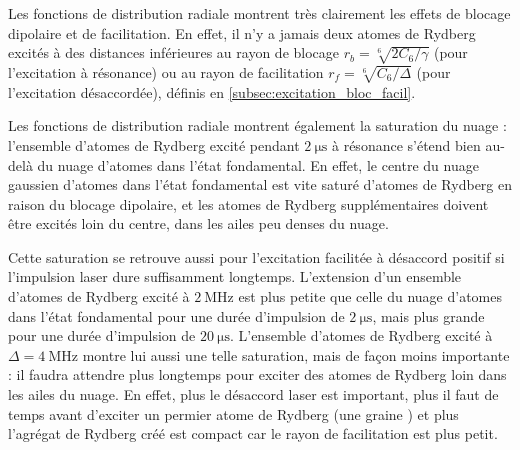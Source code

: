 Les fonctions de distribution radiale montrent très clairement les effets de blocage dipolaire et de facilitation.
En effet, il n'y a jamais deux atomes de Rydberg excités à des distances inférieures au rayon de blocage $r_b=\sqrt[6]{2C_6/\gamma}$ (pour l'excitation à résonance) ou au rayon de facilitation $r_f=\sqrt[6]{C_6/\Delta}$ (pour l'excitation désaccordée), définis en \ref{subsec:excitation_bloc_facil}.

Les fonctions de distribution radiale montrent également la saturation du nuage : l'ensemble d'atomes de Rydberg excité pendant $\SI{2}{\us}$ à résonance s'étend bien au-delà du nuage d'atomes dans l'état fondamental.
En effet, le centre du nuage gaussien d'atomes dans l'état fondamental est vite saturé d'atomes de Rydberg en raison du blocage dipolaire, et les atomes de Rydberg supplémentaires doivent être excités loin du centre, dans les ailes peu denses du nuage.

Cette saturation se retrouve aussi pour l'excitation facilitée à désaccord positif si l'impulsion laser dure suffisamment longtemps.
L'extension d'un ensemble d'atomes de Rydberg excité à $\SI{2}{\MHz}$
est plus petite que celle du nuage d'atomes dans l'état fondamental pour une durée d'impulsion de $\SI{2}{\us}$, mais plus grande pour une durée d'impulsion de $\SI{20}{\us}$.
L'ensemble d'atomes de Rydberg excité à $\Delta=\SI{4}{\MHz}$ montre lui aussi une telle saturation, mais de façon moins importante : il faudra attendre plus longtemps pour exciter des atomes de Rydberg loin dans les ailes du nuage.
En effet, plus le désaccord laser est important, plus il faut de temps avant d'exciter un  permier atome de Rydberg (une \og graine \fg{}) et plus l'agrégat de Rydberg créé est compact car le rayon de facilitation est plus petit.

